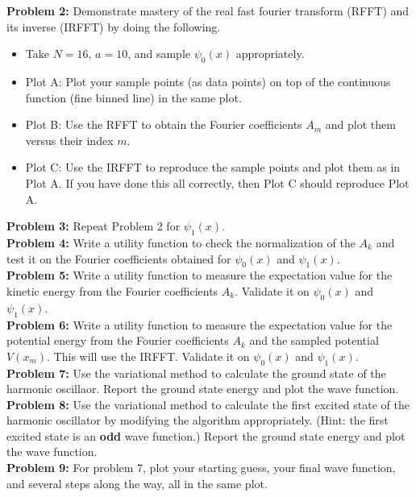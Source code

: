 \documentclass[12pt]{article}
\begin{document}
\noindent
{\bf Problem 2:} Demonstrate mastery of the real fast fourier
transform (RFFT) and its inverse (IRFFT) by doing the following.
\begin{itemize}
 \item Take $N=16$, $a=10$, and sample $\psi_0(x)$ appropriately. 
 \item Plot A: Plot your sample points (as data points) on top of the
   continuous function (fine binned line) in the same plot.
 \item Plot B:  Use the RFFT to obtain the Fourier coefficients $A_m$ and plot them versus their index $m$.
 \item Plot C:  Use the IRFFT to reproduce the sample points and plot them as in Plot A. If you have done this all correctly, then Plot C should reproduce Plot A. \\[3pt]
\end{itemize}

\noindent
{\bf Problem 3:} Repeat Problem 2 for $\psi_1(x)$.\\[3pt]

\noindent
{\bf Problem 4:} Write a utility function to check the normalization of the $A_k$ and test it on the Fourier coefficients obtained for $\psi_0(x)$ and $\psi_1(x)$.\\[3pt]

\noindent
{\bf Problem 5:} Write a utility function to measure the expectation value for the kinetic energy from the Fourier coefficients $A_k$.   Validate it on $\psi_0(x)$ and $\psi_1(x)$.\\[3pt]

\noindent
{\bf Problem 6:} Write a utility function to measure the expectation
value for the potential energy from the Fourier coefficients $A_k$ and
the sampled potential $V(x_m)$.  This will use the IRFFT.  Validate it
on $\psi_0(x)$ and $\psi_1(x)$.\\[3pt]

\noindent
{\bf Problem 7:} Use the variational method to calculate the ground state of the harmonic oscillaor.  Report the ground state energy and plot the wave function.\\[3pt]

\noindent
{\bf Problem 8:} Use the variational method to calculate the first
excited state of the harmonic oscillator by modifying the algorithm
appropriately.  (Hint: the first excited state is an {\bf odd} wave
function.)  Report the ground state energy and plot the wave
function.\\[3pt]

\noindent
{\bf Problem 9:} For problem 7, plot your starting guess, your final wave function, and several steps along the way, all in the same plot.\\[3pt]
\end{document}
